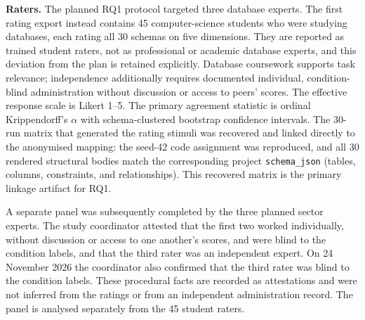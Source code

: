 \documentclass[11pt,a4paper]{article}
\begin{document}
\noindent\textbf{Raters.} The planned RQ1 protocol targeted three database experts. The first rating export instead contains 45 computer-science students who were studying databases, each rating all 30 schemas on five dimensions. They are reported as trained student raters, not as professional or academic database experts, and this deviation from the plan is retained explicitly. Database coursework supports task relevance; independence additionally requires documented individual, condition-blind administration without discussion or access to peers' scores. The effective response scale is Likert 1--5. The primary agreement statistic is ordinal Krippendorff's $\alpha$ with schema-clustered bootstrap confidence intervals. The 30-run matrix that generated the rating stimuli was recovered and linked directly to the anonymised mapping: the seed-42 code assignment was reproduced, and all 30 rendered structural bodies match the corresponding project \texttt{schema\_json} (tables, columns, constraints, and relationships). This recovered matrix is the primary linkage artifact for RQ1.

A separate panel was subsequently completed by the three planned sector experts. The study coordinator attested that the first two worked individually, without discussion or access to one another's scores, and were blind to the condition labels, and that the third rater was an independent expert. On 24 November 2026 the coordinator also confirmed that the third rater was blind to the condition labels. These procedural facts are recorded as attestations and were not inferred from the ratings or from an independent administration record. The panel is analysed separately from the 45 student raters.
\end{document}
